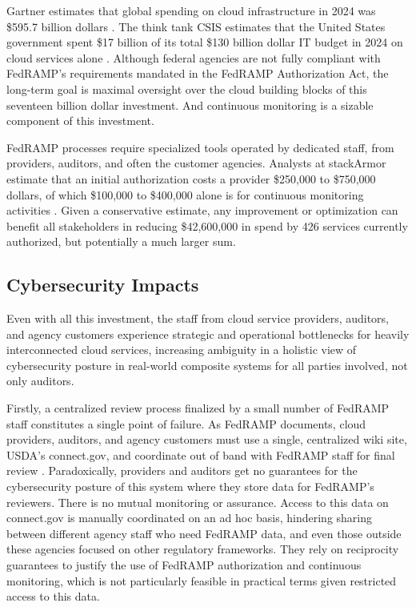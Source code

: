 \documentclass{jdf}
\begin{document}
Gartner estimates that global spending on cloud infrastructure in 2024 was \$595.7 billion dollars \citeyear{gartner24}. The think tank CSIS estimates that the United States government spent \$17 billion of its total \$130 billion dollar IT budget in 2024 on cloud services alone \citeyear[p.~1]{csis25}. Although federal agencies are not fully compliant with FedRAMP's requirements mandated in the FedRAMP Authorization Act, the long-term goal is maximal oversight over the cloud building blocks of this seventeen billion dollar investment. And continuous monitoring is a sizable component of this investment.

FedRAMP processes require specialized tools operated by dedicated staff, from providers, auditors, and often the customer agencies. Analysts at stackArmor estimate that an initial authorization costs a provider \$250,000 to \$750,000 dollars, of which \$100,000 to \$400,000 alone is for continuous monitoring activities \citeyear{stackarmor24}. Given a conservative estimate, any improvement or optimization can benefit all stakeholders in reducing \$42,600,000 in spend by 426 services currently authorized, but potentially a much larger sum.

\subsection{Cybersecurity Impacts}

Even with all this investment, the staff from cloud service providers, auditors, and agency customers experience strategic and operational bottlenecks for heavily interconnected cloud services, increasing ambiguity in a holistic view of cybersecurity posture in real-world composite systems for all parties involved, not only auditors. 

Firstly, a centralized review process finalized by a small number of FedRAMP staff constitutes a single point of failure. As FedRAMP documents, cloud providers, auditors, and agency customers must use a single, centralized wiki site, USDA's connect.gov, and coordinate out of band with FedRAMP staff for final review \citeyear[pp.~3,14]{fedramp_auth_playbook25}. Paradoxically, providers and auditors get no guarantees for the cybersecurity posture of this system where they store data for FedRAMP's reviewers. There is no mutual monitoring or assurance. Access to this data on connect.gov is manually coordinated on an ad hoc basis, hindering sharing between different agency staff who need FedRAMP data, and even those outside these agencies focused on other regulatory frameworks. They rely on reciprocity guarantees to justify the use of FedRAMP authorization and continuous monitoring, which is not particularly feasible in practical terms given restricted access to this data.
\end{document}
